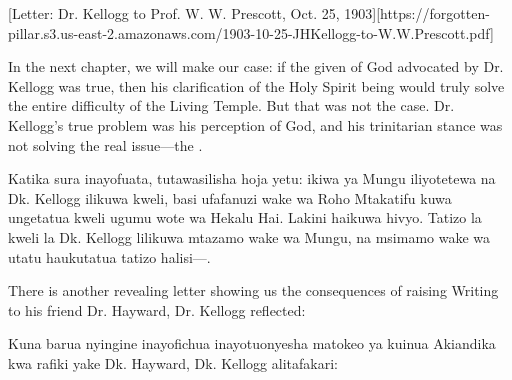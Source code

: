 [Letter: Dr. Kellogg to Prof. W. W. Prescott, Oct. 25, 1903][https://forgotten-pillar.s3.us-east-2.amazonaws.com/1903-10-25-JHKellogg-to-W.W.Prescott.pdf]


In the next chapter, we will make our case: if the given  of God advocated by Dr. Kellogg was true, then his clarification of the Holy Spirit being  would truly solve the entire difficulty of the Living Temple. But that was not the case. Dr. Kellogg's true problem was his perception of God, and his trinitarian stance was not solving the real issue—the .


Katika sura inayofuata, tutawasilisha hoja yetu: ikiwa  ya Mungu iliyotetewa na Dk. Kellogg ilikuwa kweli, basi ufafanuzi wake wa Roho Mtakatifu kuwa  ungetatua kweli ugumu wote wa Hekalu Hai. Lakini haikuwa hivyo. Tatizo la kweli la Dk. Kellogg lilikuwa mtazamo wake wa Mungu, na msimamo wake wa utatu haukutatua tatizo halisi—.


There is another revealing letter showing us the consequences of raising  Writing to his friend Dr. Hayward, Dr. Kellogg reflected:


Kuna barua nyingine inayofichua inayotuonyesha matokeo ya kuinua  Akiandika kwa rafiki yake Dk. Hayward, Dk. Kellogg alitafakari:





